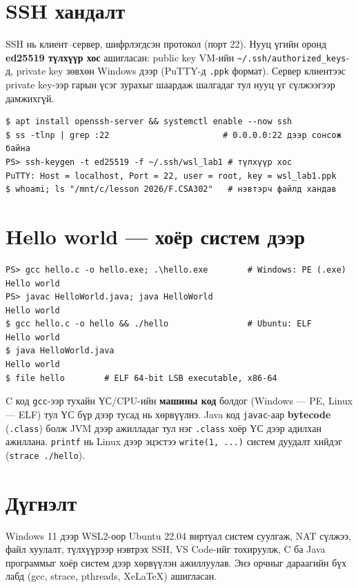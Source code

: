 \documentclass[12pt,a4paper]{article}
\begin{document}
\section{SSH хандалт}
SSH нь клиент–сервер, шифрлэгдсэн протокол (порт 22). Нууц үгийн оронд \textbf{ed25519 түлхүүр хос} ашигласан: public key VM-ийн \texttt{\textasciitilde/.ssh/authorized\_keys}-д, private key зөвхөн Windows дээр (PuTTY-д \texttt{.ppk} формат). Сервер клиентээс private key-ээр гарын үсэг зурахыг шаардаж шалгадаг тул нууц үг сүлжээгээр дамжихгүй.
\begin{lstlisting}
$ apt install openssh-server && systemctl enable --now ssh
$ ss -tlnp | grep :22                       # 0.0.0.0:22 дээр сонсож байна
PS> ssh-keygen -t ed25519 -f ~/.ssh/wsl_lab1 # түлхүүр хос
PuTTY: Host = localhost, Port = 22, user = root, key = wsl_lab1.ppk
$ whoami; ls "/mnt/c/lesson 2026/F.CSA302"   # нэвтэрч файлд хандав
\end{lstlisting}

\section{Hello world — хоёр систем дээр}
\begin{lstlisting}
PS> gcc hello.c -o hello.exe; .\hello.exe        # Windows: PE (.exe)
Hello world
PS> javac HelloWorld.java; java HelloWorld
Hello world
$ gcc hello.c -o hello && ./hello                # Ubuntu: ELF
Hello world
$ java HelloWorld.java
Hello world
$ file hello        # ELF 64-bit LSB executable, x86-64
\end{lstlisting}
C код \texttt{gcc}-ээр тухайн ҮС/CPU-ийн \textbf{машины код} болдог (Windows — PE, Linux — ELF) тул ҮС бүр дээр тусад нь хөрвүүлнэ. Java код \texttt{javac}-аар \textbf{bytecode} (\texttt{.class}) болж JVM дээр ажилладаг тул нэг \texttt{.class} хоёр ҮС дээр адилхан ажиллана. \texttt{printf} нь Linux дээр эцэстээ \texttt{write(1, ...)} систем дуудалт хийдэг (\texttt{strace ./hello}).

\section{Дүгнэлт}
Windows 11 дээр WSL2-оор Ubuntu 22.04 виртуал систем суулгаж, NAT сүлжээ, файл хуулалт, түлхүүрээр нэвтрэх SSH, VS Code-ийг тохируулж, C ба Java программыг хоёр систем дээр хөрвүүлэн ажиллуулав. Энэ орчныг дараагийн бүх лабд (gcc, strace, pthreads, XeLaTeX) ашигласан.
\end{document}
